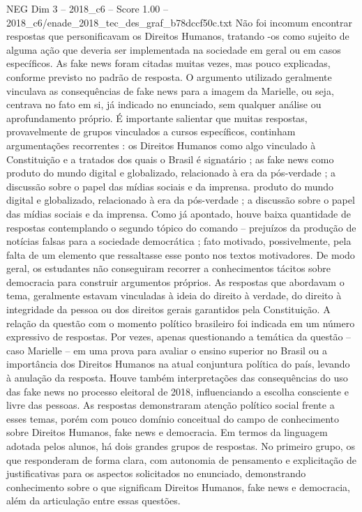 \begin{textsample}{NEG Dim 3 – 2018\_c6 – Score 1.00 – 2018\_c6/enade\_2018\_tec\_des\_graf\_b78dccf50c.txt}
Não foi incomum encontrar respostas que personificavam os Direitos Humanos, tratando -os como sujeito de alguma ação que deveria ser implementada na sociedade em geral ou em casos específicos.
As fake news foram citadas muitas vezes, mas pouco explicadas, conforme previsto no padrão de resposta.
O argumento utilizado geralmente vinculava as consequências de fake news para a imagem da Marielle, ou seja, centrava no fato em si, já indicado no enunciado, sem qualquer análise ou aprofundamento próprio.
É importante salientar que muitas respostas, provavelmente de grupos vinculados a cursos específicos, continham argumentações recorrentes : os Direitos Humanos como algo vinculado à Constituição e a tratados dos quais o Brasil é signatário ; as fake news como produto do mundo digital e globalizado, relacionado à era da pós-verdade ; a discussão sobre o papel das mídias sociais e da imprensa. produto do mundo digital e globalizado, relacionado à era da pós-verdade ; a discussão sobre o papel das mídias sociais e da imprensa.
Como já apontado, houve baixa quantidade de respostas contemplando o segundo tópico do comando – prejuízos da produção de notícias falsas para a sociedade democrática ; fato motivado, possivelmente, pela falta de um elemento que ressaltasse esse ponto nos textos motivadores.
De modo geral, os estudantes não conseguiram recorrer a conhecimentos tácitos sobre democracia para construir argumentos próprios.
As respostas que abordavam o tema, geralmente estavam vinculadas à ideia do direito à verdade, do direito à integridade da pessoa ou dos direitos gerais garantidos pela Constituição.
A relação da questão com o momento político brasileiro foi indicada em um número expressivo de respostas.
Por vezes, apenas questionando a temática da questão – caso Marielle – em uma prova para avaliar o ensino superior no Brasil ou a importância dos Direitos Humanos na atual conjuntura política do país, levando à anulação da resposta.
Houve também interpretações das consequências do uso das fake news no processo eleitoral de 2018, influenciando a escolha consciente e livre das pessoas.
As respostas demonstraram atenção político social frente a esses temas, porém com pouco domínio conceitual do campo de conhecimento sobre Direitos Humanos, fake news e democracia.
Em termos da linguagem adotada pelos alunos, há dois grandes grupos de respostas.
No primeiro grupo, os que responderam de forma clara, com autonomia de pensamento e explicitação de justificativas para os aspectos solicitados no enunciado, demonstrando conhecimento sobre o que significam Direitos Humanos, fake news e democracia, além da articulação entre essas questões.

\end{textsample}
